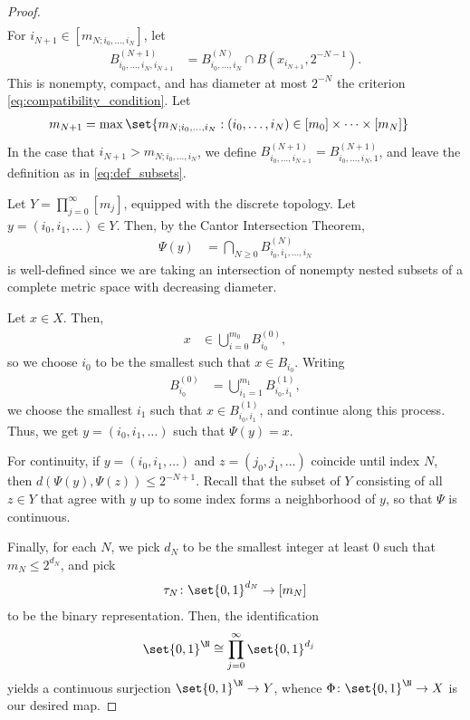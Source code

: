 \documentclass[10pt]{mypackage}
\begin{document}
\begin{proof}
\begin{align*}
  \end{align*}
  For $i_{N+1}\in \left[ m_{N;i_0,\dots,i_N} \right]$, let
  \begin{align*}
    B^{(N+1)}_{i_0,\dots,i_N,i_{N+1}} &= B^{(N)}_{i_0,\dots,i_N}\cap B\left( x_{i_{N+1}},2^{-N-1} \right).\label{eq:def_subsets}\tag{$\ast\ast$}
  \end{align*}
  This is nonempty, compact, and has diameter at most $2^{-N}$ the criterion \eqref{eq:compatibility_condition}. Let
  \begin{align*}
    m_{N+1}&=\max\set{m_{N;i_0,\dots,i_N} : \left( i_0,\dots,i_N \right)\in \left[ m_0 \right]\times\cdots\times \left[ m_N \right]}
  \end{align*}
  In the case that $i_{N+1} > m_{N;i_0,\dots,i_N}$, we define $B^{(N+1)}_{i_0,\dots,i_{N+1}} = B^{(N+1)}_{i_0,\dots,i_N,1}$, and leave the definition as in \eqref{eq:def_subsets}.

  Let $Y = \prod_{j=0}^{\infty}\left[ m_j \right]$, equipped with the discrete topology. Let $y = \left( i_0,i_1,\dots \right)\in Y$. Then, by the Cantor Intersection Theorem,
  \begin{align*}
    \Psi(y) &= \bigcap_{N\geq 0} B^{(N)}_{i_0,i_1,\dots,i_N}
  \end{align*}
  is well-defined since we are taking an intersection of nonempty nested subsets of a complete metric space with decreasing diameter.

  Let $x\in X$. Then,
  \begin{align*}
    x &\in \bigcup_{i=0}^{m_0}B_{i_0}^{(0)},
  \end{align*}
  so we choose $i_0$ to be the smallest such that $x\in B_{i_0}$. Writing
  \begin{align*}
    B_{i_0}^{(0)} &= \bigcup_{i_1=1}^{m_1}B^{(1)}_{i_0,i_1},
  \end{align*}
  we choose the smallest $i_1$ such that $x\in B^{(1)}_{i_0,i_1}$, and continue along this process. Thus, we get $y = \left( i_0,i_1,\dots \right)$ such that $\Psi(y) = x$.

  For continuity, if $y = \left( i_0,i_1,\dots \right)$ and $ z = \left( j_0,j_1,\dots \right) $ coincide until index $N$, then $d\left( \Psi(y),\Psi(z) \right) \leq 2^{-N+1}$. Recall that the subset of $Y$ consisting of all $z\in Y$ that agree with $y$ up to some index forms a neighborhood of $y$, so that $\Psi$ is continuous.

  Finally, for each $N$, we pick $d_N$ to be the smallest integer at least $0$ such that $m_{N}\leq 2^{d_N}$, and pick 
  \begin{align*}
    \tau_N\colon \set{0,1}^{d_N}\to \left[ m_N \right]
  \end{align*}
  to be the binary representation. Then, the identification
  \begin{align*}
    \set{0,1}^{\N} &\cong \prod_{j=0}^{\infty} \set{0,1}^{d_j}
  \end{align*}
  yields a continuous surjection $\set{0,1}^{\N}\to Y$, whence $\Phi\colon \set{0,1}^{\N}\to X$ is our desired map.
\end{proof}
\end{document}
